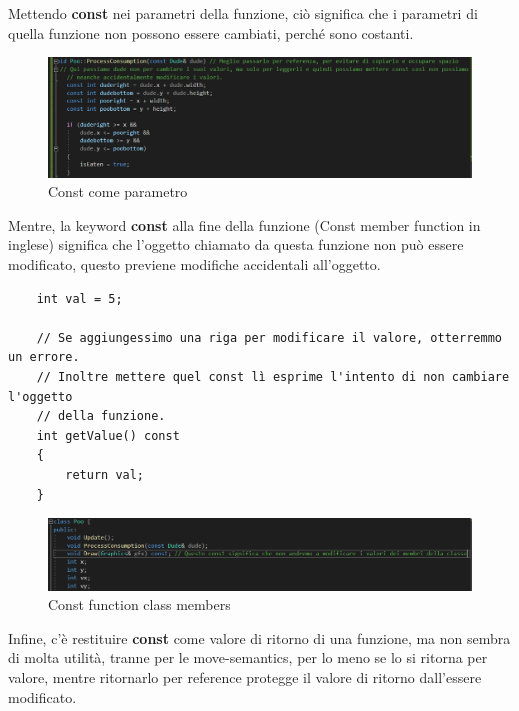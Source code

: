 \textsf{\small Mettendo \textbf{const} nei parametri della funzione, ciò significa che i parametri di quella funzione non possono essere cambiati, perché sono costanti.}



\begin{figure}[H]
	\centering
	\includegraphics[width=1.2\textwidth, height=1.2\textheight, keepaspectratio]{./imgs/const_as_parameter.png}
	\caption{Const come parametro}
	\label{fig:const_as_parameter}
\end{figure}

\textsf{\small Mentre, la keyword \textbf{const} alla fine della funzione (Const member function in inglese) significa che l'oggetto chiamato da questa funzione non può essere modificato, questo previene modifiche accidentali all'oggetto. } \\

\begin{lstlisting}
	int val = 5;
	
	// Se aggiungessimo una riga per modificare il valore, otterremmo un errore.
	// Inoltre mettere quel const lì esprime l'intento di non cambiare l'oggetto 
	// della funzione.
	int getValue() const
	{
		return val;
	}
\end{lstlisting}

\begin{figure}[H]
	\centering
	\includegraphics[width=1.2\textwidth, height=1.2\textheight, keepaspectratio]{./imgs/const_function_class_members.png}
	\caption{Const function class members}
	\label{fig:const_function_class_members}
\end{figure}

\textsf{\small Infine, c'è restituire \textbf{const} come valore di ritorno di una funzione, ma non sembra di molta utilità, tranne per le move-semantics, per lo meno se lo si ritorna per valore, mentre ritornarlo per reference protegge il valore di ritorno dall'essere modificato.} \\

